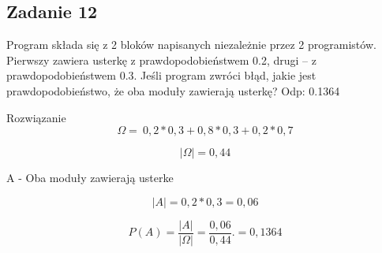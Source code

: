\subsection{Zadanie 12}

Program składa się z 2 bloków napisanych niezależnie przez 2 programistów. Pierwszy zawiera usterkę z prawdopodobieństwem 0.2, drugi -- z prawdopodobieństwem 0.3. Jeśli program zwróci błąd, jakie jest prawdopodobieństwo, że oba moduły zawierają usterkę? Odp: 0.1364

Rozwiązanie
$$
\Omega=\  0,2 * 0,3 + 0,8 * 0,3 + 0,2 * 0,7
$$

$$
|\Omega|=0,44
$$

A - Oba moduły zawierają usterke

$$
|A|=0,2 * 0,3 = 0,06
$$

$$
P(A)=\frac{|A|}{|\Omega|}=\frac{0,06}{0,44}. = 0,1364
$$

